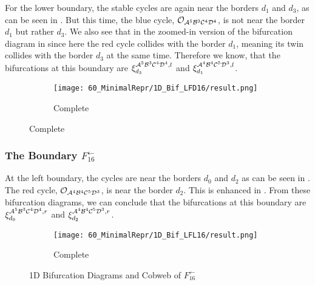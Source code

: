 For the lower boundary, the stable cycles are again near the borders $d_1$ and $d_3$, as can be seen in .
But this time, the blue cycle, $\mathcal{O}_{\mathcal{A}^5\mathcal{B}^3\mathcal{C}^4\mathcal{D}^4}$, is not near the border $d_1$ but rather $d_3$.
We also see that in the zoomed-in version of the bifurcation diagram in  since here the red cycle collides with the border $d_1$, meaning its twin collides with the border $d_3$ at the same time.
Therefore we know, that the bifurcations at this boundary are $\xi_{d_3}^{\mathcal{A}^5\mathcal{B}^3\mathcal{C}^4\mathcal{D}^4, l}$ and $\xi_{d_1}^{\mathcal{A}^4\mathcal{B}^4\mathcal{C}^5\mathcal{D}^3, l}$.

\begin{figure}
    \centering
    \begin{subfigure}{0.4\textwidth}
        \centering
        \texttt{[image: 60\_MinimalRepr/1D\_Bif\_LFD16/result.png]}
        \caption{Complete}
        \label{fig:final.bifurcation.F.down}
    \end{subfigure}
\end{figure}

\subsubsection{The Boundary $F_{16}^\leftarrow$}

At the left boundary, the cycles are near the borders $d_0$ and $d_2$ as can be seen in .
The red cycle, $\mathcal{O}_{\mathcal{A}^4\mathcal{B}^4\mathcal{C}^5\mathcal{D}^3}$, is near the border $d_2$.
This is enhanced in .
From these bifurcation diagrams, we can conclude that the bifurcations at this boundary are $\xi_{d_0}^{\mathcal{A}^5\mathcal{B}^3\mathcal{C}^4\mathcal{D}^4, r}$ and $\xi_{d_2}^{\mathcal{A}^4\mathcal{B}^4\mathcal{C}^5\mathcal{D}^3, r}$.

\begin{figure}
    \centering
    \begin{subfigure}{0.4\textwidth}
        \centering
        \texttt{[image: 60\_MinimalRepr/1D\_Bif\_LFL16/result.png]}
        \caption{Complete}
        \label{fig:final.bifurcation.F.left}
    \end{subfigure}
    \caption{1D Bifurcation Diagrams and Cobweb of $F_{16}^\leftarrow$}
\end{figure}


